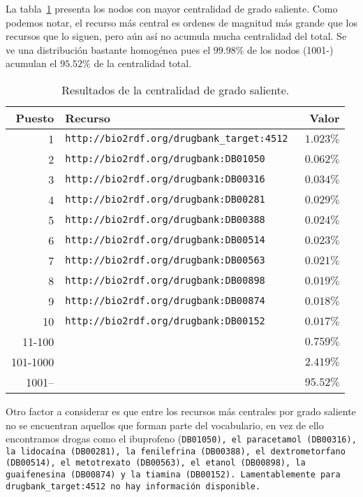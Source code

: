 La tabla~\ref{tab:odcres} presenta los nodos con mayor centralidad de grado
saliente.
Como podemos notar, el recurso más central es ordenes de magnitud más grande
que los recursos que lo siguen, pero aún así no acumula mucha centralidad del
total.
Se ve una distribución bastante homogénea pues el $99.98\%$ de los nodos (1001-)
acumulan el $95.52\%$ de la centralidad total.

\begin{table}[ht]
  \centering
  \begin{tabular}{|r|l|r|}\hline
    \bf{Puesto} & \bf{Recurso} & \bf{Valor} \\\hline
     1 & \tt{http://bio2rdf.org/drugbank\_target:4512} & $1.023\%$ \\\hline
     2 & \tt{http://bio2rdf.org/drugbank:DB01050}      & $0.062\%$ \\\hline
     3 & \tt{http://bio2rdf.org/drugbank:DB00316}      & $0.034\%$ \\\hline
     4 & \tt{http://bio2rdf.org/drugbank:DB00281}      & $0.029\%$ \\\hline
     5 & \tt{http://bio2rdf.org/drugbank:DB00388}      & $0.024\%$ \\\hline
     6 & \tt{http://bio2rdf.org/drugbank:DB00514}      & $0.023\%$ \\\hline
     7 & \tt{http://bio2rdf.org/drugbank:DB00563}      & $0.021\%$ \\\hline
     8 & \tt{http://bio2rdf.org/drugbank:DB00898}      & $0.019\%$ \\\hline
     9 & \tt{http://bio2rdf.org/drugbank:DB00874}      & $0.018\%$ \\\hline
    10 & \tt{http://bio2rdf.org/drugbank:DB00152}      & $0.017\%$ \\\hline
    11-100 		& & $0.759\%$ \\\hline
    101-1000  & & $2.419\%$ \\\hline
    1001--    & & $95.52\%$ \\\hline
  \end{tabular}
  \caption{Resultados de la centralidad de grado saliente.}\label{tab:odcres}
\end{table}

Otro factor a considerar es que entre los recursos más centrales por grado
saliente no se encuentran aquellos que forman parte del vocabulario, en vez de
ello encontramos drogas como el ibuprofeno (\tt{DB01050}), el paracetamol
(\tt{DB00316}), la lidocaína (\tt{DB00281}), la fenilefrina (\tt{DB00388}),
el dextrometorfano (\tt{DB00514}), el metotrexato (\tt{DB00563}), el etanol
(\tt{DB00898}), la guaifenesina (\tt{DB00874}) y la tiamina (\tt{DB00152}).
Lamentablemente para \tt{drugbank\_target:4512} no hay información disponible.

